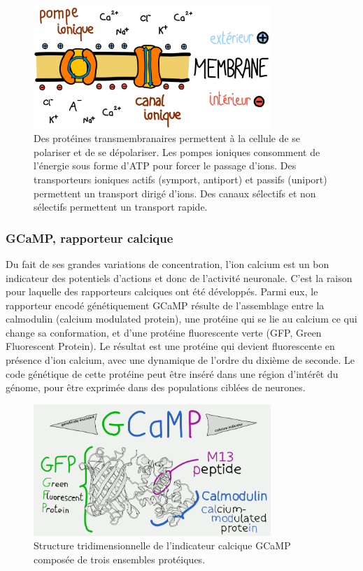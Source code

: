 \begin{figure}
\centering
\includegraphics[width=0.8\textwidth]{./files/membrane.svg.png}
\caption{Des protéines transmembranaires permettent à la cellule de se polariser et de se dépolariser. Les pompes ioniques consomment de l'énergie sous forme d'ATP pour forcer le passage d'ions. Des transporteurs ioniques actifs (symport, antiport) et passifs (uniport) permettent un transport dirigé d'ions. Des canaux sélectifs et non sélectifs permettent un transport rapide.}
\end{figure}

\subsubsection{GCaMP, rapporteur calcique}

Du fait de ses grandes variations de concentration, l'ion calcium est un bon indicateur des potentiels d'actions et donc de l'activité neuronale. C'est la raison pour laquelle des rapporteurs calciques ont été développés. Parmi eux, le rapporteur encodé génétiquement GCaMP résulte de l'assemblage entre la calmodulin (calcium modulated protein), une protéine qui se lie au calcium ce qui change sa conformation, et d'une protéine fluorescente verte (GFP, Green Fluorescent Protein). Le résultat est une protéine qui devient fluorescente en présence d'ion calcium, avec une dynamique de l'ordre du dixième de seconde. Le code génétique de cette protéine peut être inséré dans une région d'intérêt du génome, pour être exprimée dans des populations ciblées de neurones.

\begin{figure}
\centering
\includegraphics[width=0.8\textwidth]{./files/GCaMP.png}
\caption{Structure tridimensionnelle de l'indicateur calcique GCaMP composée de trois ensembles protéiques.}
\end{figure}


